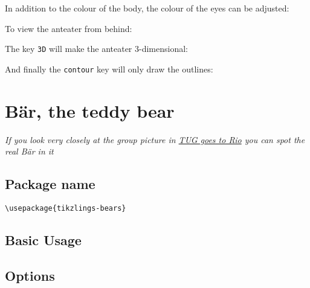 \documentclass[parskip=half]{scrartcl}
\begin{document}
In addition to the colour of the body, the colour of the eyes can be adjusted:
\begin{tcblisting}{}
\anteater[eye=red]
\end{tcblisting}

To view the anteater from behind:
\begin{tcblisting}{}
\anteater[back]
\end{tcblisting}

The key \lstinline|3D| will make the anteater 3-dimensional:
\begin{tcblisting}{}
\anteater[3D]
\end{tcblisting}

And finally the \lstinline|contour| key will only draw the outlines:
\begin{tcblisting}{}
\anteater[contour=black]
\end{tcblisting}

%
%
\clearpage
\section[Bear]{B\"ar, the teddy bear}

\emph{If you look very closely at the group picture in \href{https://www.tug.org/TUGboat/tb39-2/tb122wright-tug18.pdf}{TUG goes to Rio} you can spot the real B\"ar in it}

\subsection{Package name}

\begin{tcolorbox}[lower separated=false, lefthand width=.8\linewidth]
\vspace*{0.5cm}
\lstinline|\usepackage{tikzlings-bears}| 
\vspace*{0.5cm}
\end{tcolorbox}

\subsection{Basic Usage}

\begin{tcblisting}{}
\bear
\end{tcblisting}

\subsection{Options}
\end{document}
